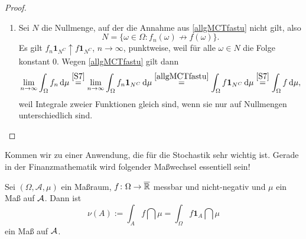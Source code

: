 \begin{proof}
\begin{enumerate}[label=(\roman*)]
\begin{itemize}
		\end{itemize}
		\item Sei $N$ die Nullmenge, auf der die Annahme aus \ref{allgMCTfastu} nicht gilt, also $$N=\{\omega\in \Omega: f_n(\omega)\not\to f(\omega)\}.$$ Es gilt $ f_n \mathbf{1}_{N^C} \uparrow f \mathbf{1}_{N^C}$, $n \to \infty$, punktweise, weil f\"ur alle $\omega\in N$ die Folge  konstant $0$. Wegen \ref{allgMCTfastu} gilt dann 
		\begin{align*}
			\lim_{n\to\infty}\int_{\Omega}f_n \, \mathrm{d} \mu \overset{\ref{S7}}{=}  \lim_{n\to\infty}\int_{\Omega}f_n \mathbf{1}_{N^C} \, \mathrm{d} \mu \overset{\ref{allgMCTfastu}}{=} \int_{\Omega}f \mathbf{1}_{N^C} \, \mathrm{d} \mu \overset{\ref{S7}}{=} \int_{\Omega}f \, \mathrm{d} \mu,
			\end{align*}
		weil Integrale zweier Funktionen gleich sind, wenn sie nur auf Nullmengen unterschiedlich sind.
	\end{enumerate}
\end{proof}



Kommen wir zu einer Anwendung, die f\"ur die Stochastik sehr wichtig ist. Gerade in der Finanzmathematik wird folgender \glqq Ma\ss wechsel\grqq{} essentiell sein!
\begin{anwendung}\label{ccd}
	Sei $(\Omega, \mathcal A, \mu)$ ein Ma\ss raum, $f\colon \Omega \rightarrow \overline{\mathbb{R}}$ messbar und nicht-negativ und $\mu$ ein Ma\ss{} auf $\mathcal{A}$. Dann ist 
	\[ \nu(A)  := \int_{A} f \dint \mu = \int_{\Omega} f \mathbf{1}_A\dint \mu \] ein Maß auf $\mathcal{A}$.
\end{anwendung}

